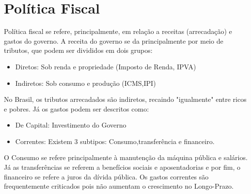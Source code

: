 \section*{Política Fiscal}
Política fiscal se refere, principalmente, em relação a receitas (arrecadação) e gastos do governo. A receita do governo se da principalmente por meio de tributos, que podem ser divididos em dois grupos: 
\begin{itemize}
    \item Diretos: Sob renda e propriedade (Imposto de Renda, IPVA)
    \item Indiretos: Sob consumo e produção (ICMS,IPI)
\end{itemize}
No Brasil, os tributos arrecadados são indiretos, recaindo "igualmente" entre ricos e pobres.
Já os gastos podem ser descritos como: 
\begin{itemize}
    \item De Capital: Investimento do Governo 
    \item Correntes: Existem 3 subtipos: Consumo,transferência e financeiro. 
\end{itemize}
O Consumo se refere principalmente à manutenção da máquina pública e salários. Já as transferências se referem a benefícios sociais e aposentadorias e por fim, o financeiro se refere a juros da dívida pública. 
Os gastos correntes são frequentemente criticados pois não aumentam o crescimento no Longo-Prazo. 
